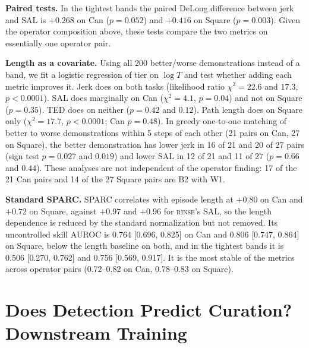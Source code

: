 \documentclass[10pt]{article}
\newcommand{\rinse}{\textmd{\textsc{rinse}}}
\begin{document}
\textbf{Paired tests.} In the tightest bands the paired DeLong difference
between jerk and SAL is $+0.268$ on Can ($p = 0.052$) and $+0.416$ on Square
($p = 0.003$). Given the operator composition above, these tests compare the
two metrics on essentially one operator pair.

\textbf{Length as a covariate.} Using all 200 better/worse demonstrations
instead of a band, we fit a logistic regression of tier on $\log T$ and test
whether adding each metric improves it. Jerk does on both tasks (likelihood
ratio $\chi^2 = 22.6$ and $17.3$, $p < 0.0001$). SAL does marginally on Can
($\chi^2 = 4.1$, $p = 0.04$) and not on Square ($p = 0.35$). TED does on
neither ($p = 0.42$ and $0.12$). Path length does on Square only
($\chi^2 = 17.7$, $p < 0.0001$; Can $p = 0.48$). In greedy one-to-one
matching of better to worse demonstrations within 5 steps of each other (21
pairs on Can, 27 on Square), the better demonstration has lower jerk in 16
of 21 and 20 of 27 pairs (sign test $p = 0.027$ and $0.019$) and lower SAL
in 12 of 21 and 11 of 27 ($p = 0.66$ and $0.44$). These analyses are not
independent of the operator finding: 17 of the 21 Can pairs and 14 of the 27
Square pairs are B2 with W1.

\textbf{Standard SPARC.} SPARC correlates with episode length at $+0.80$ on
Can and $+0.72$ on Square, against $+0.97$ and $+0.96$ for \rinse{}'s SAL,
so the length dependence is reduced by the standard normalization but not
removed. Its uncontrolled skill AUROC is 0.764 [0.696, 0.825] on Can and
0.806 [0.747, 0.864] on Square, below the length baseline on both, and in
the tightest bands it is 0.506 [0.270, 0.762] and 0.756 [0.569, 0.917]. It
is the most stable of the metrics across operator pairs (0.72--0.82 on Can,
0.78--0.83 on Square).

\section{Does Detection Predict Curation? Downstream Training}
\label{sec:training}
\end{document}
